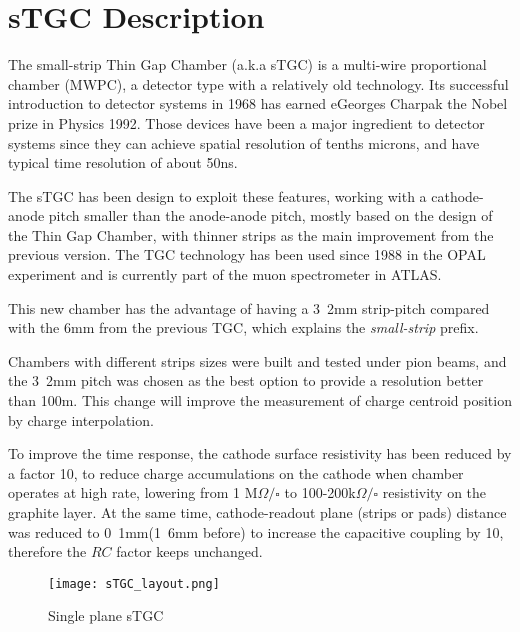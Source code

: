\section{sTGC Description}

The small-strip Thin Gap Chamber (a.k.a sTGC) is a multi-wire proportional chamber (MWPC), a detector type with a
relatively old technology. Its successful introduction to detector systems in 1968 has earned eGeorges Charpak the Nobel
prize in Physics 1992.  Those devices have been a major ingredient to detector systems since they can achieve spatial
resolution of tenths microns, and have typical time resolution of about 50ns.\par

The sTGC has been design to exploit these features,  working with a cathode-anode pitch smaller than the anode-anode pitch, mostly based on the design of
the Thin Gap Chamber\cite{tgc}, with thinner strips as the main improvement from the previous version. The TGC
technology has been used since 1988 in the OPAL experiment\cite{opal} and is currently part of the muon spectrometer in ATLAS. \par

This new chamber has the advantage of having a \unit{3.2}{mm} strip-pitch 
compared with the \unit{6}{mm} from the previous TGC, which explains the {\it small-strip} prefix.\par 

Chambers with different strips sizes were built and tested under pion beams, and the \unit{3.2}{mm} pitch was chosen as the best
option to provide a resolution better than \unit{100}{\micro m}\cite{stripwidth}.  This change will improve the
measurement of charge centroid position by charge interpolation.\par To improve the time response, the cathode surface
resistivity has been reduced by a factor 10, to reduce charge accumulations on the cathode when chamber operates at high
rate, lowering from 1 M$\Omega/\square$ to 100-200k$\Omega / \square$ resistivity on the graphite layer.  At the same
time, cathode-readout plane (strips or pads) distance was reduced to \unit{0.1}{mm}(\unit{1.6}{mm} before) to increase
the capacitive coupling by 10, therefore the $RC$ factor keeps unchanged.\par


\begin{figure}[ht]
		\centering
		\texttt{[image: sTGC\_layout.png]}
		\caption{Single plane sTGC}\label{fig:sTGC}
\end{figure}

